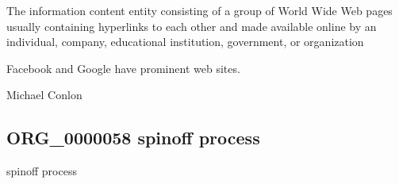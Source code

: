 \documentclass[letterpaper,10pt,english]{sphinxmanual}
\begin{document}
\begin{sphinxShadowBox}

\sphinxAtStartPar
{\hyperref[\detokenize{doc-IAO_0000030::doc}]{}}
\end{sphinxShadowBox}

\begin{sphinxShadowBox}

\sphinxAtStartPar
The information content entity consisting of a group of World Wide Web pages usually containing hyperlinks to each other and made available online by an individual, company, educational institution, government, or organization
\end{sphinxShadowBox}

\begin{sphinxShadowBox}

\sphinxAtStartPar
{}
\end{sphinxShadowBox}

\begin{sphinxShadowBox}

\sphinxAtStartPar
Facebook and Google have prominent web sites.
\end{sphinxShadowBox}

\begin{sphinxShadowBox}

\sphinxAtStartPar
{}
\end{sphinxShadowBox}

\begin{sphinxShadowBox}

\sphinxAtStartPar
Michael Conlon 
\end{sphinxShadowBox}
\begin{quote}

\ignorespaces \end{quote}


\subsection{ORG\_0000058 \sphinxhyphen{} spin\sphinxhyphen{}off process}
\label{\detokenize{doc-ORG_0000058:org-0000058-spin-off-process}}\label{\detokenize{doc-ORG_0000058:index-0}}\label{\detokenize{doc-ORG_0000058::doc}}
\begin{sphinxShadowBox}

\sphinxAtStartPar
spin\sphinxhyphen{}off process
\end{sphinxShadowBox}
\end{document}
